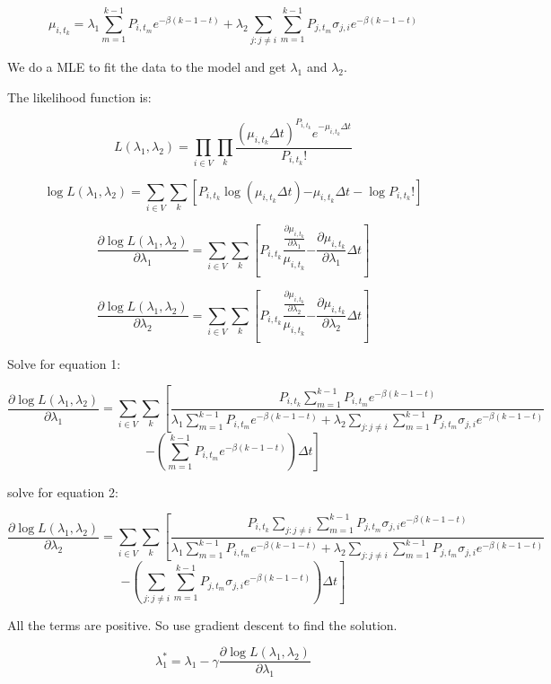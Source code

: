 \documentclass[12pt]{article}
\begin{document}
$$\mu_{i,t_k} = \lambda_1 \sum_{m = 1}^{ k-1} P_{i,t_m} e^{-\beta(k-1-t)} + \lambda_2 \sum_{j:j\neq i} \sum_{m = 1}^{ k-1} P_{j,t_m} \sigma_{j,i} e^{-\beta(k-1-t)}$$

We do a MLE to fit the data to the model and get $\lambda_1$ and $\lambda_2$.

The likelihood function is:

$$L(\lambda_1, \lambda_2) = \prod_{i \in V} \prod_{k} \frac{(\mu_{i,t_k}\Delta t)^{P_{i,t_k}} e^{-\mu_{i,t_k}\Delta t}}{P_{i,t_k}!}
$$


$$
\log L(\lambda_1, \lambda_2) = \sum_{i \in V} \sum_{k}\left[ {P_{i,t_k} \log{(\mu_{i,t_k}\Delta t)} {-\mu_{i,t_k}\Delta t}} - \log{P_{i,t_k}!} \right]
$$


$$
\frac{\partial \log L(\lambda_1, \lambda_2)}{\partial \lambda_1} = \sum_{i \in V} \sum_{k}\left[ {P_{i,t_k} \frac{ \frac{\partial \mu_{i,t_k}}{\partial \lambda_1}}{\mu_{i,t_k}} {- \frac{\partial \mu_{i,t_k}}{\partial \lambda_1}\Delta t}} \right] 
$$


$$
\frac{\partial \log L(\lambda_1, \lambda_2)}{\partial \lambda_2} = \sum_{i \in V} \sum_{k}\left[ {P_{i,t_k} \frac{ \frac{\partial \mu_{i,t_k}}{\partial \lambda_2}}{\mu_{i,t_k}} {- \frac{\partial \mu_{i,t_k}}{\partial \lambda_2}\Delta t}} \right] 
$$

Solve for equation 1:

$$
\frac{\partial \log L(\lambda_1, \lambda_2)}{\partial \lambda_1} = \sum_{i \in V} \sum_{k}\left[ { \frac{P_{i,t_k}\sum_{m = 1}^{ k-1} P_{i,t_m} e^{-\beta(k-1-t)}}{ \lambda_1 \sum_{m = 1}^{ k-1} P_{i,t_m} e^{-\beta(k-1-t)} + \lambda_2 \sum_{j:j\neq i} \sum_{m = 1}^{ k-1} P_{j,t_m} \sigma_{j,i} e^{-\beta(k-1-t)}}} \right.
$$
$$
\left. {- \left( \sum_{m = 1}^{ k-1} P_{i,t_m} e^{-\beta(k-1-t)} \right)\Delta t} \right] 
$$

solve for equation 2:

$$
\frac{\partial \log L(\lambda_1, \lambda_2)}{\partial \lambda_2} = \sum_{i \in V} \sum_{k}\left[ { \frac{P_{i,t_k}\sum_{j:j\neq i} \sum_{m = 1}^{ k-1} P_{j,t_m} \sigma_{j,i} e^{-\beta(k-1-t)} }{ \lambda_1 \sum_{m = 1}^{ k-1} P_{i,t_m} e^{-\beta(k-1-t)} + \lambda_2 \sum_{j:j\neq i} \sum_{m = 1}^{ k-1} P_{j,t_m} \sigma_{j,i} e^{-\beta(k-1-t)}}} \right.
$$
$$
\left. {- \left( \sum_{j:j\neq i} \sum_{m = 1}^{ k-1} P_{j,t_m} \sigma_{j,i} e^{-\beta(k-1-t)} \right)\Delta t} \right] 
$$

All the terms are positive. So use gradient descent to find the solution.

$$\lambda_1^* = \lambda_1 - \gamma \frac{\partial \log L(\lambda_1, \lambda_2)}{\partial \lambda_1}$$
\end{document}
